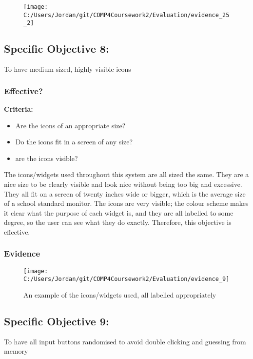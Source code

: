 \begin{figure}[H]
	\texttt{[image: C:/Users/Jordan/git/COMP4Coursework2/Evaluation/evidence\_25\_2]}
\end{figure}

\subsection{Specific Objective 8: }

To have medium sized, highly visible icons

\subsubsection{Effective?}

\textbf{Criteria: }

\begin{itemize}
	\item Are the icons of an appropriate size?
	\item Do the icons fit in a screen of any size?
	\item are the icons visible?
\end{itemize}

The icons/widgets used throughout this system are all sized the same. They are a nice size to be clearly visible and look nice without being too big and excessive. They all fit on a screen of twenty inches wide or bigger, which is the average size of a school standard monitor. The icons are very visible; the colour scheme makes it clear what the purpose of each widget is, and they are all labelled to some degree, so the user can see what they do exactly. Therefore, this objective is effective.

\subsubsection{Evidence}

\begin{figure}[H]
	\texttt{[image: C:/Users/Jordan/git/COMP4Coursework2/Evaluation/evidence\_9]}
	\caption{An example of the icons/widgets used, all labelled appropriately}
\end{figure}

\subsection{Specific Objective 9: }

To have all input buttons randomised to avoid double clicking and guessing from memory

